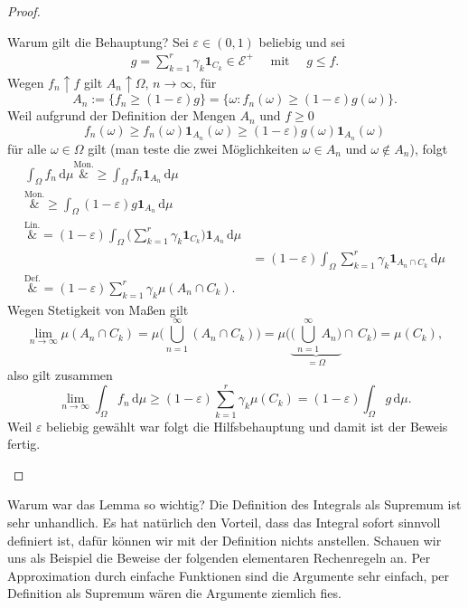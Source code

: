 \begin{proof}
\begin{itemize}
		Warum gilt die Behauptung? Sei $\varepsilon \in (0,1)$ beliebig und sei 
		\begin{align*}
		 g = \sum_{k = 1}^{r} \gamma_k \mathbf{1}_{C_k} \in \mathcal E^+ \quad \text{ mit }\quad g\leq f.
		 \end{align*}
		  Wegen $f_n \uparrow f$ gilt $A_n \uparrow \Omega$, $n \to \infty$, 	  
		   für \[A_n := \big\{ f_n \geq (1 - \varepsilon)g \big\} = \big\{ \omega \! : f_n (\omega) \geq (1 - \varepsilon) g(\omega) \big\}.\]
		Weil aufgrund der Definition der Mengen $A_n$ und $f\geq 0$		
		$$f_n(\omega)\geq f_n(\omega)\mathbf{1}_{A_n}(\omega)\geq  (1-\varepsilon)g(\omega)\mathbf{1}_{A_n}(\omega)$$ f\"ur alle $\omega \in \Omega$ gilt (man teste die zwei M\"oglichkeiten $\omega \in A_n$ und $\omega \notin A_n$), folgt
		\begin{align*}
			\int_{\Omega} f_n\, \mathrm{d}\mu \overset{\text{Mon.}}&{\geq} \int_{\Omega} f_n \mathbf{1}_{A_n}\, \mathrm{d}\mu\\
			\overset{\text{Mon.}}&{\geq} \int_{\Omega} (1-\varepsilon) g \mathbf{1}_{A_n}\, \mathrm{d}\mu \\
			\overset{\text{Lin.}}&{=}  (1 - \varepsilon) \int_{\Omega} \Big(\sum_{k = 1}^{r} \gamma_k \mathbf{1}_{C_k}\Big) \mathbf{1}_{A_n} \,\mathrm{d}\mu\\& = (1 - \varepsilon) \int_{\Omega} \sum_{k = 1}^{r} \gamma_k \mathbf{1}_{A_n \cap  C_k}\,\mathrm{d}\mu\\
			\overset{\text{Def.}}&{=} (1-\varepsilon) \sum_{k=1}^r \gamma_k \mu(A_n\cap C_k).
		\end{align*} 
		Wegen Stetigkeit von Maßen gilt \[\lim_{n \to \infty} \mu(A_n \cap C_k) = \mu \Big(\bigcup_{n = 1}^{\infty} (A_n \cap  C_k) \Big) = \mu \Big(\underbrace{\Big(\bigcup_{n = 1}^{\infty} A_n \Big)}_{= \Omega} \cap \,C_k \Big)=\mu(C_k),\]
	also gilt zusammen
		\[ \lim_{n\to\infty} \int_{\Omega} f_n \, \mathrm{d}\mu \geq (1-\varepsilon) \sum\limits_{k = 1}^{r}  \gamma_k \mu(C_k) = (1-\varepsilon) \int_{\Omega} g\, \mathrm{d}\mu. \]
		Weil $\varepsilon$ beliebig gew\"ahlt war folgt die Hilfsbehauptung und damit ist der Beweis fertig.
	\end{itemize}	
\end{proof}
\marginpar{\textcolor{red}{Vorlesung 10}}



Warum war das Lemma so wichtig? Die Definition des Integrals als Supremum ist sehr unhandlich. Es hat nat\"urlich den Vorteil, dass das Integral sofort sinnvoll definiert ist, daf\"ur k\"onnen wir mit der Definition nichts anstellen. Schauen wir uns als Beispiel die Beweise der folgenden elementaren Rechenregeln an. Per Approximation durch einfache Funktionen sind die Argumente sehr einfach, per Definition als Supremum w\"aren die Argumente ziemlich fies.

